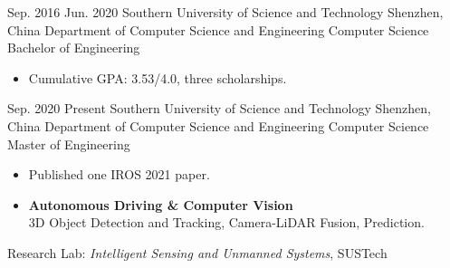 \documentclass{resume}
\begin{document}
\makeheader

\begin{educations}
  \education%
    {Sep. 2016}%
    {Jun. 2020}%
    {Southern University of Science and Technology}%
    {Shenzhen, China}%
    {Department of Computer Science and Engineering}%
    {Computer Science}%
    {Bachelor of Engineering}%
	{\begin{itemize}%
		\item Cumulative GPA: 3.53/4.0, three scholarships.
	\end{itemize}}%
 \education%
    {Sep. 2020}%
    {Present}%
    {Southern University of Science and Technology}%
    {Shenzhen, China}%
    {Department of Computer Science and Engineering}%
    {Computer Science}%
    {Master of Engineering}%
	{\begin{itemize}%
		\item Published one IROS 2021 paper.
	\end{itemize}}%
	
\end{educations}
	
\begin{itemize}
  \item \textbf{Autonomous Driving \& Computer Vision}\\
  	3D Object Detection and Tracking, Camera-LiDAR Fusion, Prediction.
\end{itemize}


Research Lab: \textit{Intelligent Sensing and Unmanned Systems}, SUSTech
\end{document}
